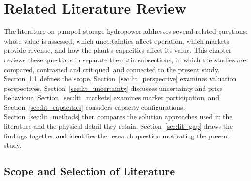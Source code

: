 
\section{Related Literature Review}
\label{sec:literature}

The literature on pumped-storage hydropower addresses several related
questions: whose value is assessed, which uncertainties affect operation,
which markets provide revenue, and how the plant's capacities affect its
value. This chapter reviews these questions in separate thematic
subsections, in which the studies are compared, contrasted and critiqued,
and connected to the present study. Section~\ref{sec:lit_scope} defines
the scope, Section~\ref{sec:lit_perspective} examines valuation
perspectives, Section~\ref{sec:lit_uncertainty} discusses uncertainty and
price behaviour, Section~\ref{sec:lit_markets} examines market
participation, and Section~\ref{sec:lit_capacities} considers capacity
configurations. Section~\ref{sec:lit_methods} then compares the solution
approaches used in the literature and the physical detail they retain.
Section~\ref{sec:lit_gap} draws the findings together and identifies the
research question motivating the present study.

\subsection{Scope and Selection of Literature}
\label{sec:lit_scope}


